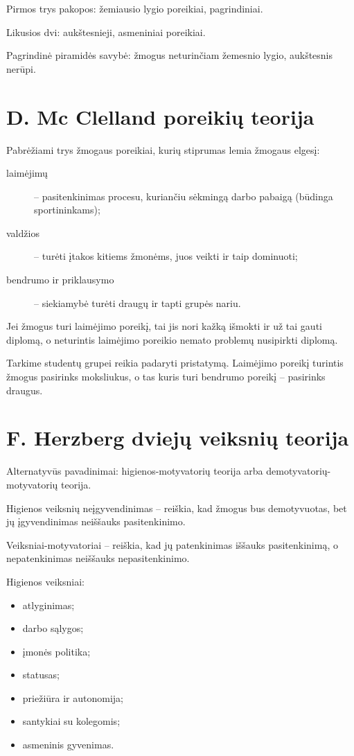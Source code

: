 Pirmos trys pakopos: žemiausio lygio poreikiai, pagrindiniai.

Likusios dvi: aukštesnieji, asmeniniai poreikiai.

Pagrindinė piramidės savybė: žmogus neturinčiam žemesnio lygio, aukštesnis
nerūpi.

\section{D. Mc Clelland poreikių teorija}

Pabrėžiami trys žmogaus poreikiai, kurių stiprumas lemia žmogaus elgesį:
\begin{description}
  \item[laimėjimų] – pasitenkinimas procesu, kuriančiu sėkmingą darbo
    pabaigą (būdinga sportininkams);
  \item[valdžios] – turėti įtakos kitiems žmonėms, juos veikti ir
    taip dominuoti;
  \item[bendrumo ir priklausymo] – siekiamybė turėti draugų ir tapti
    grupės nariu.
\end{description}

\begin{exmp}
  Jei žmogus turi laimėjimo poreikį, tai jis nori kažką išmokti ir už
  tai gauti diplomą, o neturintis laimėjimo poreikio nemato problemų
  nusipirkti diplomą.
\end{exmp}

\begin{exmp}
  Tarkime studentų grupei reikia padaryti pristatymą. Laimėjimo poreikį
  turintis žmogus pasirinks moksliukus, o tas kuris turi bendrumo
  poreikį – pasirinks draugus.
\end{exmp}

\section{F. Herzberg dviejų veiksnių teorija}

Alternatyvūs pavadinimai: higienos-motyvatorių teorija arba
demotyvatorių-motyvatorių teorija.

Higienos veiksnių neįgyvendinimas – reiškia, kad žmogus bus demotyvuotas, 
bet jų įgyvendinimas neiššauks pasitenkinimo.

Veiksniai-motyvatoriai – reiškia, kad jų patenkinimas iššauks pasitenkinimą,
o nepatenkinimas neiššauks nepasitenkinimo.

Higienos veiksniai:
\begin{itemize}
  \item atlyginimas;
  \item darbo sąlygos;
  \item įmonės politika;
  \item statusas;
  \item priežiūra ir autonomija;
  \item santykiai su kolegomis;
  \item asmeninis gyvenimas.
\end{itemize}

